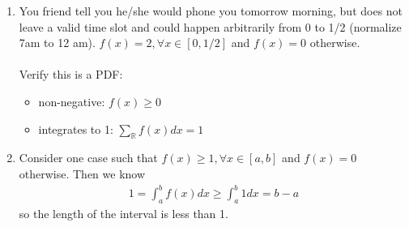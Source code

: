 

\setcounter{theorem}{1}
\begin{exercise}[BH.5.2] 
\begin{solution}
    \begin{enumerate}
        \item You friend tell you he/she would phone you tomorrow morning, but does not leave a valid time slot and could happen arbitrarily from 0 to 1/2 (normalize 7am to 12 am). $f(x)=2, \forall x\in [0,1/2] $ and $f(x)=0$ otherwise. \\~\\
        Verify this is a PDF:
        \begin{itemize}
            \item non-negative: $f(x)\geq 0$
            \item integrates to 1: $\sum_\mathbb{R} f(x) dx=1$
        \end{itemize}
        \item  Consider one case such that $f(x)\geq 1, \forall x\in [a,b] $ and $f(x)=0$ otherwise. Then we know 
        \begin{align*}
            1= \int_{a}^{b} f(x)dx \geq \int_{a}^{b} 1dx = b-a
        \end{align*}
        so the length of the interval is less than 1.
    \end{enumerate}
\end{solution}
\end{exercise}


